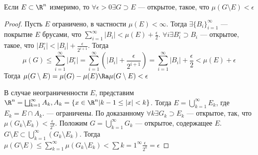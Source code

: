 \begin{lemma}
    Если \(E \subset \R^n\) измеримо, то \(\forall \epsilon > 0 \exists G \supset E\) --- открытое, такое, что \(\mu(G \setminus E) < \epsilon\)
\end{lemma}
\begin{proof}
    Пусть \(E\) ограничено, в частности \(\mu(E) < \infty\). Тогда \(\exists  \{B_i\}_{i = 1}^\infty\) --- покрытие \(E\) брусами, что \(\sum_{i = 1}^\infty |B_i| < \mu(E) + \frac{\epsilon}{2}\). \(\forall i \exists B_i^\circ \supset B_i\) --- открытое, такое, что \(|B_i^\circ| < |B_i| + \frac{\epsilon}{2^{i + 1}}\). Тогда
    \[\mu(G) \le \sum_{i = 1}^\infty |B_i^\circ| = \sum_{i = 1}^\infty \left(|B_i| + \frac{\epsilon}{2^{i + 1}}\right) = \sum_{i = 1}^\infty |B_i| + \frac{\epsilon}{2} < \mu(E) + \epsilon\]
    Тогда \(\mu(G \setminus E) = \mu(G) - \mu(E) \Ra \mu(G \setminus E) < \epsilon\)

    В случае неограниченности \(E\), представим \(\R^n = \bigsqcup_{k = 1}^\infty A_k, A_k = \{x \in \R^n | k - 1 \le |x| < k\}\). Тогда \(E = \bigcup_{k = 1}^\infty E_k\), где \(E_k = E \cap A_k\). --- ограничены. По доказанному \(\forall k \exists G_k \supset E_k\) --- открытое, так, что \(\mu(G_k \setminus E_k) < \frac{\epsilon}{2^{k}}\). Положим \(G = \bigcup_{k = 1}^\infty G_k\) --- открытое, содержащее \(E\). \(G \setminus E \subset \bigcup_{k = 1}^\infty (G_k \setminus E_k)\). Тогда \(\mu(G \setminus E) \le \sum_{k = 1}^\infty \mu(G_k \setminus E_k) < \sum{k = 1}^\infty \frac{\epsilon}{2^k} = \epsilon\)
\end{proof}
